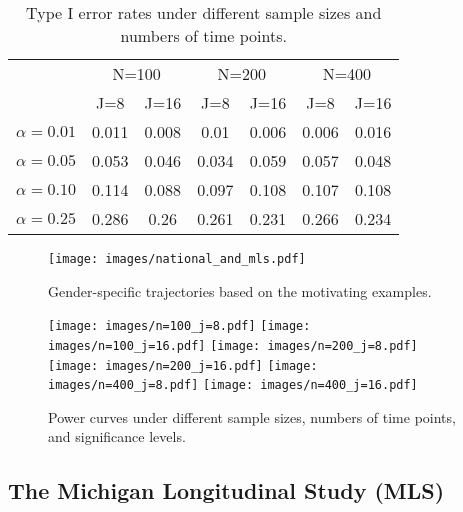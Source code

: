 \begin{table}[htbp]
\begin{center}
\caption{Type I error rates under different sample sizes and
numbers of time points.}
\begin{tabular}{c|cccccc}
 &  \multicolumn{2}{c}{N=100}  & \multicolumn{2}{c}{N=200} & \multicolumn{2}{c}{N=400} \\
& J=8& J=16&  J=8&J=16 &J=8&J=16\\
$\alpha=0.01$&0.011 &0.008 &0.01  &0.006 &0.006&0.016\\
$\alpha=0.05$&0.053 &0.046 &0.034  &0.059 &0.057&0.048\\
$\alpha=0.10$&0.114 & 0.088& 0.097 &0.108 &0.107&0.108\\
$\alpha=0.25$&0.286 & 0.26& 0.261 &0.231 &0.266&0.234\\
      
\end{tabular}
\end{center}
\end{table}



\newpage
\begin{figure}
  \begin{center}
    \texttt{[image: images/national\_and\_mls.pdf]}
    \caption{Gender-specific trajectories based on the motivating examples.}
  \end{center}
\end{figure}

\begin{figure}
\centering
\texttt{[image: images/n=100\_j=8.pdf]}
\texttt{[image: images/n=100\_j=16.pdf]}
\texttt{[image: images/n=200\_j=8.pdf]}
\texttt{[image: images/n=200\_j=16.pdf]}
\texttt{[image: images/n=400\_j=8.pdf]}
\texttt{[image: images/n=400\_j=16.pdf]}
\caption{Power curves under different sample sizes, numbers of
time points, and significance levels.}
\end{figure}



\subsection{The Michigan Longitudinal Study (MLS)}

